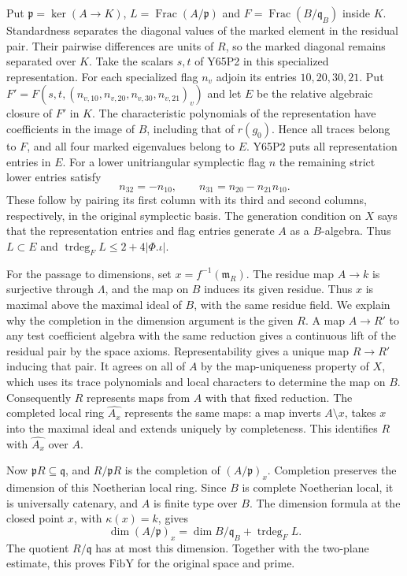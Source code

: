 Put $\mathfrak p=\ker(A\to K)$, $L=\operatorname{Frac}(A/\mathfrak p)$
and $F=\operatorname{Frac}(B/\mathfrak q_B)$ inside $K$.
Standardness separates the diagonal values of the marked element in
the residual pair. Their pairwise differences are units of $R$, so the
marked diagonal remains separated over $K$. Take the scalars $s,t$
of Y65P2 in this specialized representation. For each specialized flag
$n_v$ adjoin its entries $10,20,30,21$. Put $F'=F(s,t,(n_{v,10},n_{v,20},n_{v,30},n_{v,21})_v)$ and
let $E$ be the relative algebraic closure of $F'$ in $K$.
The characteristic polynomials of the representation have coefficients
in the image of $B$, including that of $r(g_0)$. Hence all traces belong
to $F$, and all four marked eigenvalues belong to $E$. Y65P2 puts all
representation entries in $E$. For a lower unitriangular symplectic
flag $n$ the remaining strict lower entries satisfy
\[
 n_{32}=-n_{10},\qquad n_{31}=n_{20}-n_{21}n_{10}.
\]
These follow by pairing its first column with its third and second
columns, respectively, in the original symplectic basis. The
generation condition on $X$ says that the representation entries and
flag entries generate $A$ as a $B$-algebra. Thus $L\subset E$ and
$\operatorname{trdeg}_{F}L\le 2+4|\Phi.\iota|$.

For the passage to dimensions, set $x=f^{-1}(\mathfrak m_R)$.
The residue map $A\to k$ is surjective through $\Lambda$, and the
map on $B$ induces its given residue. Thus $x$ is maximal above the
maximal ideal of $B$, with the same residue field. We explain why
the completion in the dimension argument is the given $R$.
A map $A\to R'$ to any test coefficient algebra with the same
reduction gives a continuous lift of the residual pair by the space
axioms. Representability gives a unique map $R\to R'$ inducing that
pair. It agrees on all of $A$ by the map-uniqueness property of $X$,
which uses its trace polynomials and local characters to determine
the map on $B$. Consequently $R$ represents maps from $A$ with that
fixed reduction. The completed local ring $\widehat{A_x}$ represents
the same maps: a map inverts $A\setminus x$, takes $x$ into the
maximal ideal and extends uniquely by completeness. This identifies
$R$ with $\widehat{A_x}$ over $A$.

Now $\mathfrak pR\subseteq\mathfrak q$, and $R/\mathfrak pR$ is
the completion of $(A/\mathfrak p)_x$. Completion preserves the
dimension of this Noetherian local ring. Since $B$ is complete
Noetherian local, it is universally catenary, and $A$ is finite type
over $B$. The dimension formula at the closed point $x$, with
$\kappa(x)=k$, gives
\[
 \dim (A/\mathfrak p)_x
       =\dim B/\mathfrak q_B+\operatorname{trdeg}_{F}L .
\]
The quotient $R/\mathfrak q$ has at most this dimension. Together
with the two-plane estimate, this proves $\mathrm{FibY}$ for the
original space and prime.
